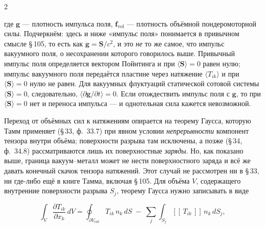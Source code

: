 \documentclass[twoside, 10pt]{article}
\begin{document}
\begin{multicols}{2}

где \(\mathbf{g}\) --- плотность импульса поля, \(\mathbf{f}_{\mathrm{vol}}\) --- плотность объёмной пондеромоторной силы. Подчеркнём: здесь и ниже «импульс поля» понимается в привычном смысле \S\,105, то есть как \(\mathbf g=\mathbf S/c^2\), и это \emph{не} то же самое, что импульс вакуумного поля, о несохранении которого говорилось выше. Привычный импульс поля определяется вектором Пойнтинга и при \(\langle\mathbf S\rangle=0\) равен нулю; импульс вакуумного поля передаётся пластине через натяжение \(\langle T_{ik}\rangle\) и при \(\langle\mathbf S\rangle=0\) нулю не равен. Для вакуумных флуктуаций статической сотовой системы
\(\langle\mathbf{S}\rangle=0\), следовательно, \(\langle\partial\mathbf{g}/\partial t\rangle=0\).
Если отождествить импульс поля с \(\mathbf g\), то при \(\langle\mathbf S\rangle=0\) нет и
переноса импульса --- и однотельная сила кажется невозможной.

Переход от объёмных сил к натяжениям опирается на теорему Гаусса, которую Тамм применяет
(\S\,33, ф.~33.7) при явном условии \emph{непрерывности} компонент тензора внутри объёма;
поверхности разрыва там исключены, а позже (\S\,34, ф.~34.8) рассматриваются лишь их
поверхностные \emph{заряды}. Но, как показано выше, граница вакуум--металл может не нести
поверхностного заряда и всё же давать конечный скачок тензора натяжений. Этот случай не
рассмотрен ни в \S\,33, ни где-либо ещё в книге Тамма, включая \S\,105. Для объёма \(V\),
содержащего внутренние поверхности разрыва \(S_j\), теорему Гаусса нужно записывать в виде

\end{multicols}
\[
\int_V \frac{\partial T_{ik}}{\partial x_k}\,dV
= \oint_{\partial V_{\mathrm{ext}}} T_{ik}\,n_k\,dS
\;-\; \sum_j \int_{S_j} [\![\,T_{ik}\,]\!]\,n_k\,dS_j ,
\]
\end{document}

